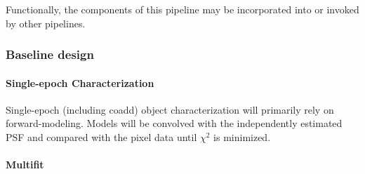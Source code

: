 \documentclass[12pt]{article}
\newcommand{\wbsPSF}{WBS 02C.04.03}
\begin{document}
Functionally, the components of this pipeline may be incorporated into or invoked by other pipelines.

\subsubsection{Baseline design}

\paragraph{Single-epoch Characterization}

Single-epoch (including coadd) object characterization will primarily rely on forward-modeling. Models will be convolved with the independently estimated PSF and compared with the pixel data until $\chi^2$ is minimized. %


\paragraph{Multifit}
\end{document}
